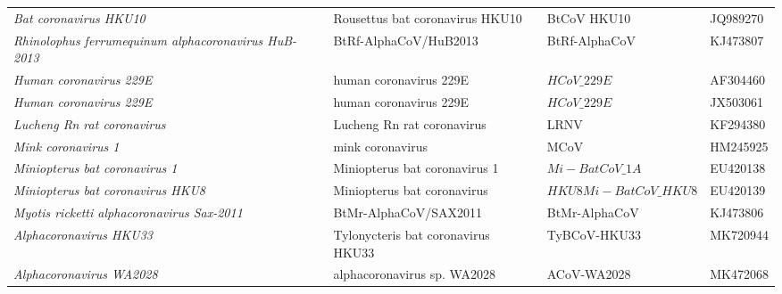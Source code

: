 \begin{table}[H]
\begin{tabularx}{\textwidth}{@{}>{\raggedright\arraybackslash}p{4cm}>{\raggedright\arraybackslash}p{4.5cm}>{\raggedright\arraybackslash}p{3cm}>{\raggedright\arraybackslash}X@{}}
    \textit{Bat coronavirus HKU10}                                  & Rousettus bat coronavirus HKU10                      & BtCoV HKU10                                   &  JQ989270             \\
    \textit{Rhinolophus ferrumequinum alphacoronavirus HuB-2013}    & BtRf-AlphaCoV/HuB2013                                & BtRf-AlphaCoV                                 &  KJ473807             \\
    \textit{Human coronavirus 229E}                                 & human coronavirus 229E                               & $HCoV\_{229E}$                                &  AF304460             \\
    \textit{Human coronavirus 229E}                                 & human coronavirus 229E                               & $HCoV\_{229E}$                                &  JX503061             \\
    \textit{Lucheng Rn rat coronavirus}                             & Lucheng Rn rat coronavirus                           & LRNV                                          &  KF294380             \\
    \textit{Mink coronavirus 1}                                     & mink coronavirus                                     & MCoV                                          &  HM245925             \\
    \textit{Miniopterus bat coronavirus 1}                          & Miniopterus bat coronavirus 1                        & $Mi-BatCoV\_{1A}$                             &  EU420138             \\
    \textit{Miniopterus bat coronavirus HKU8}                       & Miniopterus bat coronavirus                          & $HKU8Mi-BatCoV\_{HKU8}$                       &  EU420139             \\
    \textit{Myotis ricketti alphacoronavirus Sax-2011}              & BtMr-AlphaCoV/SAX2011                                & BtMr-AlphaCoV                                 &  KJ473806             \\
    \textit{Alphacoronavirus HKU33}                                 & Tylonycteris bat coronavirus HKU33                   & TyBCoV-HKU33                                  &  MK720944             \\
    \textit{Alphacoronavirus WA2028}                                & alphacoronavirus sp. WA2028                          & ACoV-WA2028                                   &  MK472068             \\

\end{tabularx}
\end{table}
